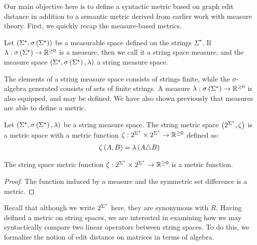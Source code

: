 Our main objective here is to define a syntactic metric
based on graph edit distance in addition to a semantic metric
derived from earlier work with measure theory.
First, we quickly recap the measure-based metrics.

\begin{definition}
  Let
  \(\left(\Sigma^\star, \sigma\left(\Sigma^\star\right)\right)\)
  be a measurable space defined on the strings \(\Sigma^\star\).
  If \(\lambda : \sigma\left(\Sigma^\star\right) \to \mathbb{R}^{\geq 0}\) is a measure,
  then we call it a string space measure,
  and the measure space
  \(\left(\Sigma^\star, \sigma\left(\Sigma^\star\right), \lambda\right)\)
  a string measure space.
\end{definition}

The elements of a string measure space consists of strings finite,
while the \(\sigma\)-algebra generated consists of sets of finite strings.
A measure \(\lambda : \sigma\left(\Sigma^\star\right) \to \mathbb{R}^{\geq 0}\) is also
equipped, and may be defined.
We have also shown previously that
measures are able to define a metric.

\begin{definition}
  Let
  \(\left(\Sigma^\star, \sigma\left(\Sigma^\star\right), \lambda\right)\)
  be a string measure space.
  The string metric space \(\left(2^{\Sigma^\star}, \zeta\right)\) is
  a metric space with a metric function
  \(\zeta : 2^{\Sigma^\star} \times 2^{\Sigma^\star} \to \mathbb{R}^{\geq 0}\)
  defined as:
  \begin{align*}
    \zeta \left(A, B\right)
      = \lambda\left(A \triangle B\right)
  \end{align*}
\end{definition}
\begin{theorem}
  The string space metric function
  \(\zeta : 2^{\Sigma^\star} \times 2^{\Sigma^\star} \to \mathbb{R}^{\geq 0}\)
  is a metric function.
\end{theorem}
\begin{proof}
  The function induced by a measure and the symmetric set difference
  is a metric.
\end{proof}

Recall that although we write \(2^{\Sigma^\star}\) here,
they are synonymous with \(R\).
Having defined a metric on string spaces,
we are interested in examining how we may
syntactically compare two linear operators
between string spaces.
To do this, we formalize the notion of edit distance on matrices
in terms of algebra.

